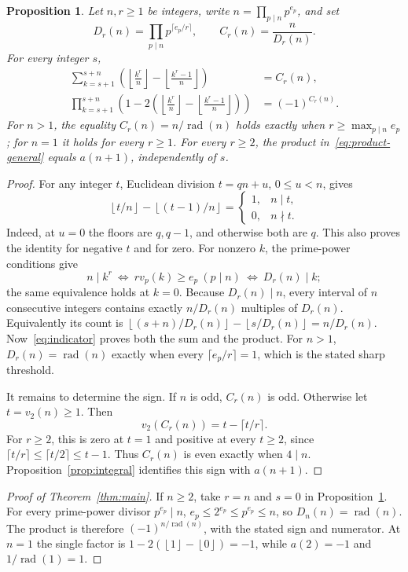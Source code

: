 \documentclass[11pt]{article}
\newtheorem{proposition}[theorem]{Proposition}
\newcommand{\rad}{\operatorname{rad}}
\newcommand{\floor}[1]{\left\lfloor #1\right\rfloor}
\begin{document}
\begin{proposition}\label{prop:general}
Let $n,r\ge1$ be integers, write $n=\prod_{p\mid n}p^{e_p}$, and set
\[
 D_r(n)=\prod_{p\mid n}p^{\lceil e_p/r\rceil},\qquad
 C_r(n)=\frac{n}{D_r(n)}.
\]
For every integer $s$,
\begin{align}
 \sum_{k=s+1}^{s+n}\left(
 \floor{\frac{k^r}{n}}-\floor{\frac{k^r-1}{n}}\right)&=C_r(n),
 \label{eq:count}\\
 \prod_{k=s+1}^{s+n}\left(1-2\left(
 \floor{\frac{k^r}{n}}-\floor{\frac{k^r-1}{n}}\right)\right)
 &=(-1)^{C_r(n)}.\label{eq:product-general}
\end{align}
For $n>1$, the equality $C_r(n)=n/\rad(n)$ holds exactly when
$r\ge\max_{p\mid n}e_p$; for $n=1$ it holds for every $r\ge1$.
For every $r\ge2$, the product in~\eqref{eq:product-general} equals
$a(n+1)$, independently of $s$.
\end{proposition}
\begin{proof}
For any integer $t$, Euclidean division $t=qn+u$, $0\le u<n$, gives
\begin{equation}\label{eq:indicator}
 \floor{t/n}-\floor{(t-1)/n}
 =\begin{cases}1,&n\mid t,\\0,&n\nmid t.\end{cases}
\end{equation}
Indeed, at $u=0$ the floors are $q,q-1$, and otherwise both are $q$.
This also proves the identity for negative $t$ and for zero.
For nonzero $k$, the prime-power conditions give
\[
 n\mid k^r
 \ \Longleftrightarrow\ 
 r v_p(k)\ge e_p\ (p\mid n)
 \ \Longleftrightarrow\ D_r(n)\mid k;
\]
the same equivalence holds at $k=0$.
Because $D_r(n)\mid n$, every interval of $n$ consecutive integers
contains exactly $n/D_r(n)$ multiples of $D_r(n)$.
Equivalently its count is
$\floor{(s+n)/D_r(n)}-\floor{s/D_r(n)}=n/D_r(n)$.
Now~\eqref{eq:indicator} proves both the sum and the product.
For $n>1$, $D_r(n)=\rad(n)$ exactly when every
$\lceil e_p/r\rceil=1$, which is the stated sharp threshold.

It remains to determine the sign. If $n$ is odd, $C_r(n)$ is odd.
Otherwise let $t=v_2(n)\ge1$. Then
\[
 v_2(C_r(n))=t-\lceil t/r\rceil.
\]
For $r\ge2$, this is zero at $t=1$ and positive at every $t\ge2$,
since $\lceil t/r\rceil\le\lceil t/2\rceil\le t-1$.
Thus $C_r(n)$ is even exactly when $4\mid n$.
Proposition~\ref{prop:integral} identifies this sign with $a(n+1)$.
\end{proof}

\begin{proof}[Proof of Theorem~\ref{thm:main}]
If $n\ge2$, take $r=n$ and $s=0$ in Proposition~\ref{prop:general}.
For every prime-power divisor $p^{e_p}\mid n$,
$e_p\le 2^{e_p}\le p^{e_p}\le n$, so $D_n(n)=\rad(n)$.
The product is therefore $(-1)^{n/\rad(n)}$, with the stated sign and
numerator. At $n=1$ the single factor is
$1-2(\floor{1}-\floor{0})=-1$, while
$a(2)=-1$ and $1/\rad(1)=1$.
\end{proof}
\end{document}
